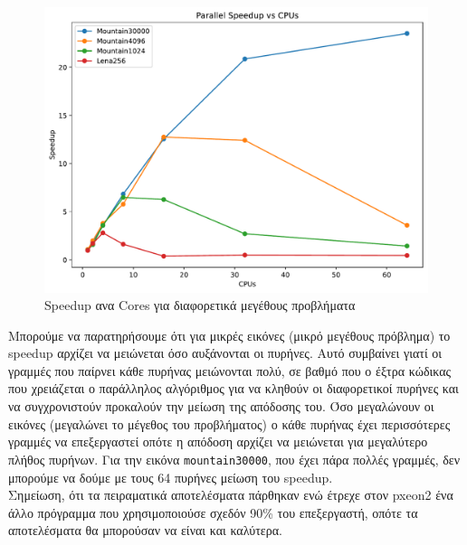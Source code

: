 \documentclass[12pt]{article}
\begin{document}
\begin{figure}[H]
    \centering
    \includegraphics[width=0.8\linewidth]{./pics/speedupPlot.pdf}
    \caption{Speedup ανα Cores για διαφορετικά μεγέθους προβλήματα}
\end{figure}

Μπορούμε να παρατηρήσουμε ότι για μικρές εικόνες (μικρό μεγέθους πρόβλημα) το speedup αρχίζει να μειώνεται όσο αυξάνονται οι πυρήνες. Αυτό συμβαίνει γιατί οι γραμμές που παίρνει κάθε πυρήνας μειώνονται πολύ, σε βαθμό που ο έξτρα κώδικας που χρειάζεται ο παράλληλος αλγόριθμος για να κληθούν οι διαφορετικοί πυρήνες και να συγχρονιστούν προκαλούν την μείωση της απόδοσης του. Όσο μεγαλώνουν οι εικόνες (μεγαλώνει το μέγεθος του προβλήματος) ο κάθε πυρήνας έχει περισσότερες γραμμές να επεξεργαστεί οπότε η απόδοση αρχίζει να μειώνεται για μεγαλύτερο πλήθος πυρήνων. Για την εικόνα \verb|mountain30000|, που έχει πάρα πολλές γραμμές, δεν μπορούμε να δούμε με τους 64 πυρήνες μείωση του speedup.\\

Σημείωση, ότι τα πειραματικά αποτελέσματα πάρθηκαν ενώ έτρεχε στον pxeon2 ένα άλλο πρόγραμμα που χρησιμοποιούσε σχεδόν 90\% του επεξεργαστή, οπότε τα αποτελέσματα θα μπορούσαν να είναι και καλύτερα.

\vspace{1.5em}
\nocite{*}
\printbibliography
\end{document}
